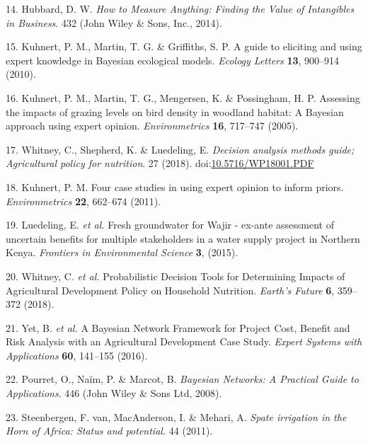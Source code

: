 \documentclass[12pt,oneside]{article}
\begin{document}
\leavevmode\hypertarget{ref-Hubbard_2014}{}%
14. Hubbard, D. W. \emph{How to Measure Anything: Finding the Value of Intangibles in Business}. 432 (John Wiley \& Sons, Inc., 2014).

\leavevmode\hypertarget{ref-Kuhnert_et_al_2010}{}%
15. Kuhnert, P. M., Martin, T. G. \& Griffiths, S. P. A guide to eliciting and using expert knowledge in Bayesian ecological models. \emph{Ecology Letters} \textbf{13}, 900--914 (2010).

\leavevmode\hypertarget{ref-Kuhnert_et_al_2005}{}%
16. Kuhnert, P. M., Martin, T. G., Mengersen, K. \& Possingham, H. P. Assessing the impacts of grazing levels on bird density in woodland habitat: A Bayesian approach using expert opinion. \emph{Environmetrics} \textbf{16}, 717--747 (2005).

\leavevmode\hypertarget{ref-Whitney_et_al_2018}{}%
17. Whitney, C., Shepherd, K. \& Luedeling, E. \emph{Decision analysis methods guide; Agricultural policy for nutrition}. 27 (2018). doi:\href{https://doi.org/10.5716/WP18001.PDF}{10.5716/WP18001.PDF}

\leavevmode\hypertarget{ref-Kuhnert_2011}{}%
18. Kuhnert, P. M. Four case studies in using expert opinion to inform priors. \emph{Environmetrics} \textbf{22}, 662--674 (2011).

\leavevmode\hypertarget{ref-Luedeling_et_al_2015}{}%
19. Luedeling, E. \emph{et al.} Fresh groundwater for Wajir - ex-ante assessment of uncertain benefits for multiple stakeholders in a water supply project in Northern Kenya. \emph{Frontiers in Environmental Science} \textbf{3}, (2015).

\leavevmode\hypertarget{ref-Whitney_et_al_2018a}{}%
20. Whitney, C. \emph{et al.} Probabilistic Decision Tools for Determining Impacts of Agricultural Development Policy on Household Nutrition. \emph{Earth's Future} \textbf{6}, 359--372 (2018).

\leavevmode\hypertarget{ref-Yet_et_al_2016}{}%
21. Yet, B. \emph{et al.} A Bayesian Network Framework for Project Cost, Benefit and Risk Analysis with an Agricultural Development Case Study. \emph{Expert Systems with Applications} \textbf{60}, 141--155 (2016).

\leavevmode\hypertarget{ref-Pourret_et_al_2008}{}%
22. Pourret, O., Naïm, P. \& Marcot, B. \emph{Bayesian Networks: A Practical Guide to Applications}. 446 (John Wiley \& Sons Ltd, 2008).

\leavevmode\hypertarget{ref-VanSteenbergen_et_al_2011}{}%
23. Steenbergen, F. van, MacAnderson, I. \& Mehari, A. \emph{Spate irrigation in the Horn of Africa: Status and potential.} 44 (2011).
\end{document}
